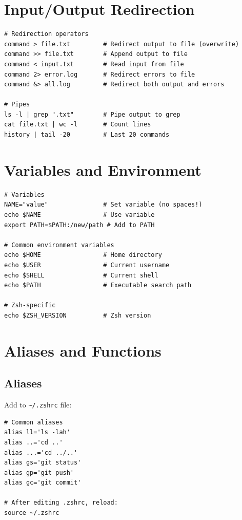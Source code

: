 \documentclass[11pt]{article}
\begin{document}
\section{Input/Output Redirection}

\begin{lstlisting}
# Redirection operators
command > file.txt         # Redirect output to file (overwrite)
command >> file.txt        # Append output to file
command < input.txt        # Read input from file
command 2> error.log       # Redirect errors to file
command &> all.log         # Redirect both output and errors

# Pipes
ls -l | grep ".txt"        # Pipe output to grep
cat file.txt | wc -l       # Count lines
history | tail -20         # Last 20 commands
\end{lstlisting}

\section{Variables and Environment}

\begin{lstlisting}
# Variables
NAME="value"               # Set variable (no spaces!)
echo $NAME                 # Use variable
export PATH=$PATH:/new/path # Add to PATH

# Common environment variables
echo $HOME                 # Home directory
echo $USER                 # Current username
echo $SHELL                # Current shell
echo $PATH                 # Executable search path

# Zsh-specific
echo $ZSH_VERSION          # Zsh version
\end{lstlisting}

\section{Aliases and Functions}

\subsection{Aliases}

Add to \texttt{\textasciitilde/.zshrc} file:

\begin{lstlisting}
# Common aliases
alias ll='ls -lah'
alias ..='cd ..'
alias ...='cd ../..'
alias gs='git status'
alias gp='git push'
alias gc='git commit'

# After editing .zshrc, reload:
source ~/.zshrc
\end{lstlisting}
\end{document}

